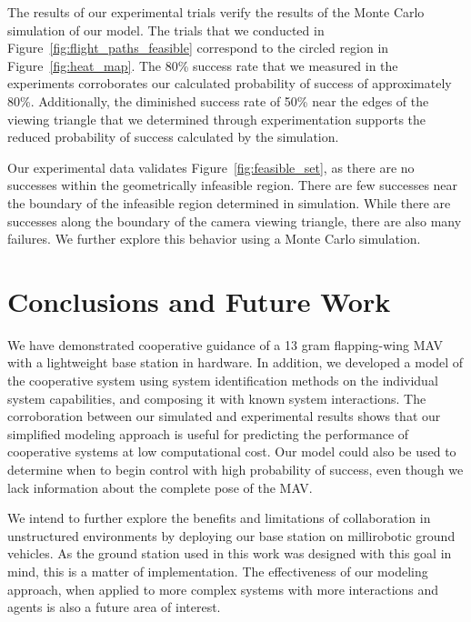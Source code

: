 \documentclass{aamas2013}
\begin{document}
The results of our experimental trials verify the results of the Monte Carlo
simulation of our model. The trials that we conducted in
Figure~\ref{fig:flight_paths_feasible} correspond to the circled region in
Figure~\ref{fig:heat_map}. The 80\% success rate that we measured in the
experiments corroborates our calculated probability of success of
approximately 80\%. Additionally, the diminished success rate of 50\% near the
edges of the viewing triangle that we determined through experimentation
supports the reduced probability of success calculated by the simulation. 

Our experimental data validates Figure~\ref{fig:feasible_set}, as there are 
no successes within the geometrically infeasible region. There are few 
successes near the boundary of the infeasible region determined in 
simulation. While there are successes along the boundary of the camera 
viewing triangle, there are also many failures. We further explore this 
behavior using a Monte Carlo simulation.

\section{Conclusions and Future Work}
We have demonstrated cooperative guidance of a 13 gram flapping-wing MAV with
a lightweight base station in hardware. In addition, we developed a model of
the cooperative system using system identification methods on the individual
system capabilities, and composing it with known system interactions. The
corroboration between our simulated and experimental results shows that our
simplified modeling approach is useful for predicting the performance of
cooperative systems at low computational cost. Our model could also be used to
determine when to begin control with high probability of success, even though
we lack information about the complete pose of the MAV.

We intend to further explore the benefits and limitations of collaboration in
unstructured environments by deploying our base station on millirobotic ground
vehicles. As the ground station used in this work was designed with this goal
in mind, this is a matter of implementation. The effectiveness of our modeling
approach, when applied to more complex systems with more interactions and 
agents is also a future area of interest. 

\end{document}
